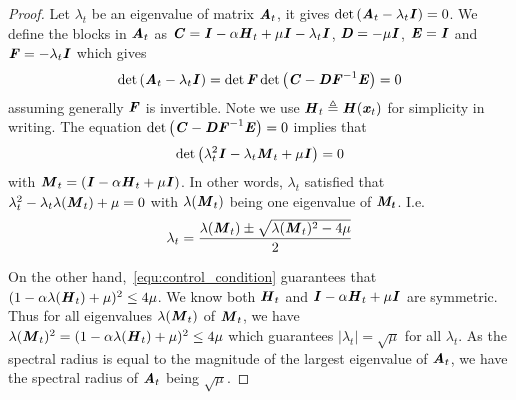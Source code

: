 \begin{lemma}
\begin{proof}
Let $\lambda_t$ be an eigenvalue of matrix $\bm{\mathit{A}}_t$, it gives 
$\det\left(\bm{\mathit{A}}_t - \lambda_t \bm{\mathit{I}} \right) = 0$. 
We define the blocks in $\bm{\mathit{A}}_t$ as $\bm{\mathit{C}} = \bm{\mathit{I}} - \alpha \bm{\mathit{H}}_t + \mu \bm{\mathit{I}} - \lambda_t \bm{\mathit{I}}$, $\bm{\mathit{D}} = -\mu \bm{\mathit{I}}$,
$\bm{\mathit{E}} = \bm{\mathit{I}}$ and $\bm{\mathit{F}} = -\lambda_t \bm{\mathit{I}}$ which gives
\[
\det \left( \bm{\mathit{A}}_t - \lambda_t \bm{\mathit{I}}\right) = \det{\bm{\mathit{F}}} \det{\left(\bm{\mathit{C}} - \bm{\mathit{D}} \bm{\mathit{F}}^{-1}
\bm{\mathit{E}} \right)} = 0
\]
assuming generally $\bm{\mathit{F}}$ is invertible. Note we use $\bm{\mathit{H}}_t\triangleq\bm{\mathit{H}}(\bm{\mathit{x}}_t)$ for simplicity in writing. The equation $\det{\left(\bm{\mathit{C}} - \bm{\mathit{D}} \bm{\mathit{F}}^{-1}
\bm{\mathit{E}} \right)} = 0$ implies that
\begin{equation}
\det \left( \lambda_t^2\bm{\mathit{I}} - \lambda_t \bm{\mathit{M}}_t + \mu \bm{\mathit{I}} \right) = 0
\label{equ:control_condition_2}
\end{equation}
with $\bm{\mathit{M}}_t = \left( \bm{\mathit{I}} - \alpha \bm{\mathit{H}}_t + \mu \bm{\mathit{I}} \right)$. In other words, $\lambda_t$ satisfied that $\lambda_t^2 - \lambda_t \lambda(\bm{\mathit{M}}_t) + \mu = 0$ with $\lambda(\bm{\mathit{M}}_t)$ being one eigenvalue of $\bm{\mathit{M_t}}$. I.e.
\begin{equation}
	\lambda_t = \frac{\lambda(\bm{\mathit{M}}_t) \pm \sqrt{\lambda(\bm{\mathit{M}}_t)^2 - 4\mu}}{2}
\end{equation}

On the other hand,~\eqref{equ:control_condition} guarantees that $(1 - \alpha \lambda(\bm{\mathit{H}}_t) + \mu)^2 \leq 4\mu$. We know both $\bm{\mathit{H}}_t$ and $\bm{\mathit{I}} - \alpha \bm{\mathit{H}}_t + \mu \bm{\mathit{I}}$ are symmetric. Thus for all eigenvalues $\lambda(\bm{\mathit{M}}_t)$ of $\bm{\mathit{M}}_t$, we have $\lambda(\bm{\mathit{M}}_t)^2 = (1 - \alpha \lambda(\bm{\mathit{H}}_t) + \mu)^2 \leq 4\mu$ which guarantees $| \lambda_t | = \sqrt{\mu}$ for all $\lambda_t$. As the spectral radius is equal to the magnitude of the largest eigenvalue of $\bm{\mathit{A}}_t$, we have the spectral radius of $\bm{\mathit{A}}_t$ being $\sqrt{\mu}$.


\end{proof}
	
\end{lemma}


